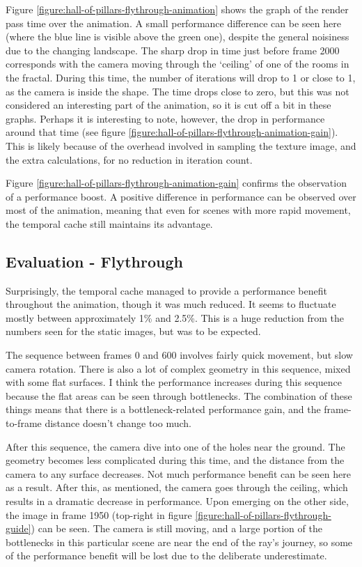 Figure \ref{figure:hall-of-pillars-flythrough-animation} shows the graph of the render pass time over the animation. A small performance difference can be seen here (where the blue line is visible above the green one), despite the general noisiness due to the changing landscape. The sharp drop in time just before frame 2000 corresponds with the camera moving through the `ceiling' of one of the rooms in the fractal. During this time, the number of iterations will drop to 1 or close to 1, as the camera is inside the shape. The time drops close to zero, but this was not considered an interesting part of the animation, so it is cut off a bit in these graphs. Perhaps it is interesting to note, however, the drop in performance around that time (see figure \ref{figure:hall-of-pillars-flythrough-animation-gain}). This is likely because of the overhead involved in sampling the texture image, and the extra calculations, for no reduction in iteration count.

Figure \ref{figure:hall-of-pillars-flythrough-animation-gain} confirms the observation of a performance boost. A positive difference in performance can be observed over most of the animation, meaning that even for scenes with more rapid movement, the temporal cache still maintains its advantage.

\subsection{Evaluation - Flythrough}

Surprisingly, the temporal cache managed to provide a performance benefit throughout the animation, though it was much reduced. It seems to fluctuate mostly between approximately 1\% and 2.5\%. This is a huge reduction from the numbers seen for the static images, but was to be expected.\newline

The sequence between frames 0 and 600 involves fairly quick movement, but slow camera rotation. There is also a lot of complex geometry in this sequence, mixed with some flat surfaces. I think the performance increases during this sequence because the flat areas can be seen through bottlenecks. The combination of these things means that there is a bottleneck-related performance gain, and the frame-to-frame distance doesn't change too much.\newline

After this sequence, the camera dive into one of the holes near the ground. The geometry becomes less complicated during this time, and the distance from the camera to any surface decreases. Not much performance benefit can be seen here as a result. After this, as mentioned, the camera goes through the ceiling, which results in a dramatic decrease in performance. Upon emerging on the other side, the image in frame 1950 (top-right in figure \ref{figure:hall-of-pillars-flythrough-guide}) can be seen. The camera is still moving, and a large portion of the bottlenecks in this particular scene are near the end of the ray's journey, so some of the performance benefit will be lost due to the deliberate underestimate.\newline

